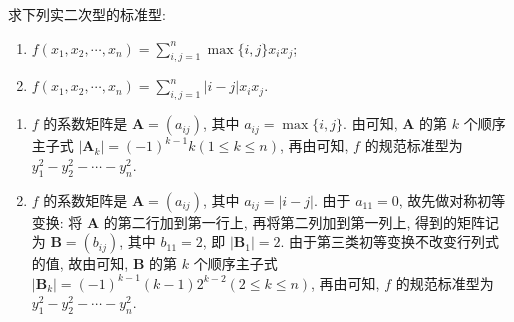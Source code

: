\documentclass[../../main.tex]{subfiles}%
\begin{document}
\begin{example}
求下列实二次型的标准型:
\begin{enumerate}
\item \(f(x_1,x_2,\cdots,x_n)=\sum_{i,j = 1}^{n}\max\{i,j\}x_ix_j\);
\item \(f(x_1,x_2,\cdots,x_n)=\sum_{i,j = 1}^{n}|i - j|x_ix_j\).
\end{enumerate}
\end{example}
\begin{solution}
\begin{enumerate}
\item \(f\) 的系数矩阵是 \(\boldsymbol{A}=(a_{ij})\), 其中 \(a_{ij}=\max\{i,j\}\). 由可知, \(\boldsymbol{A}\) 的第 \(k\) 个顺序主子式 \(|\boldsymbol{A}_k|=(-1)^{k - 1}k(1\leqslant  k\leqslant  n)\), 再由可知, \(f\) 的规范标准型为 \(y_1^2 - y_2^2 - \cdots - y_n^2\).
\item \(f\) 的系数矩阵是 \(\boldsymbol{A}=(a_{ij})\), 其中 \(a_{ij}=|i - j|\). 由于 \(a_{11}=0\), 故先做对称初等变换: 将 \(\boldsymbol{A}\) 的第二行加到第一行上, 再将第二列加到第一列上, 得到的矩阵记为 \(\boldsymbol{B}=(b_{ij})\), 其中 \(b_{11}=2\), 即 \(|\boldsymbol{B}_1| = 2\). 由于第三类初等变换不改变行列式的值, 故由可知, \(\boldsymbol{B}\) 的第 \(k\) 个顺序主子式 \(|\boldsymbol{B}_k|=(-1)^{k - 1}(k - 1)2^{k - 2}(2\leqslant  k\leqslant  n)\), 再由可知, \(f\) 的规范标准型为 \(y_1^2 - y_2^2 - \cdots - y_n^2\). 
\end{enumerate} 

\end{solution}
\end{document}
